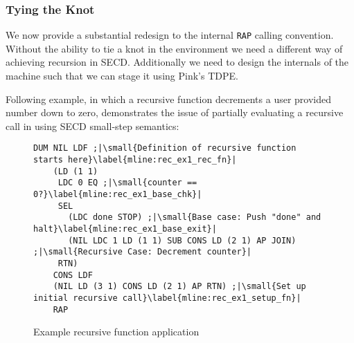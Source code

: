 \documentclass[a4paper,12pt,twoside,openright]{report}
\theoremstyle{definition}
\begin{document}



\subsubsection{Tying the Knot}\label{ssubsec:knot}
We now provide a substantial redesign to the internal \texttt{RAP} calling convention. Without the ability to tie a knot in the environment we need a different way of achieving recursion in SECD. Additionally we need to design the internals of the machine such that we can stage it using Pink's TDPE.

Following example, in which a recursive function decrements a user provided number down to zero, demonstrates the issue of partially evaluating a recursive call in using SECD small-step semantics:

\begin{figure}
\centering
\begin{verbatim}
DUM NIL LDF ;|\small{Definition of recursive function starts here}\label{mline:rec_ex1_rec_fn}|
    (LD (1 1)
     LDC 0 EQ ;|\small{counter == 0?}\label{mline:rec_ex1_base_chk}|
     SEL
       (LDC done STOP) ;|\small{Base case: Push "done" and halt}\label{mline:rec_ex1_base_exit}|
       (NIL LDC 1 LD (1 1) SUB CONS LD (2 1) AP JOIN) ;|\small{Recursive Case: Decrement counter}|
     RTN)
    CONS LDF
    (NIL LD (3 1) CONS LD (2 1) AP RTN) ;|\small{Set up initial recursive call}\label{mline:rec_ex1_setup_fn}|
    RAP
\end{verbatim}
\caption{Example recursive function application}
\label{lst:secd_recursion_ex1}
\end{figure}
\end{document}
